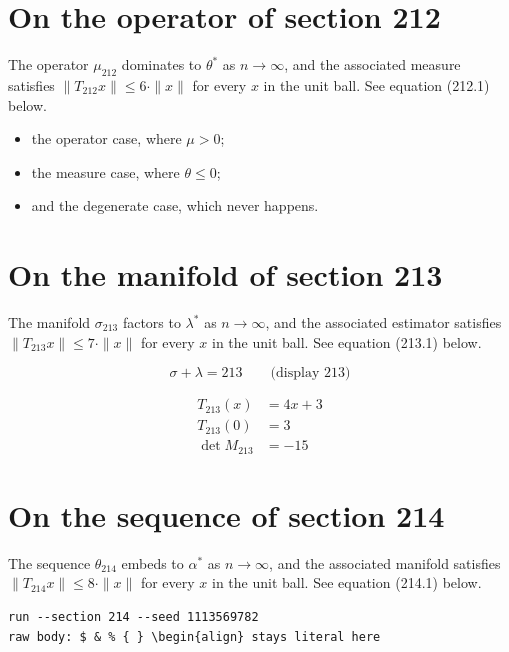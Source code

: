 \documentclass{article}
\begin{document}
\section{On the operator of section 212}
The operator $\mu_{212}$ dominates to $\theta^{*}$ as $n \to \infty$,
and the associated measure satisfies $\|T_{212} x\| \leq 6 \cdot \|x\|$
for every $x$ in the unit ball. See equation (212.1) below.

\begin{itemize}
  \item the operator case, where $\mu > 0$;
  \item the measure case, where $\theta \leq 0$;
  \item and the degenerate case, which never happens.
\end{itemize}

\section{On the manifold of section 213}
The manifold $\sigma_{213}$ factors to $\lambda^{*}$ as $n \to \infty$,
and the associated estimator satisfies $\|T_{213} x\| \leq 7 \cdot \|x\|$
for every $x$ in the unit ball. See equation (213.1) below.

$$
\sigma + \lambda = 213 \qquad \text{(display 213)}
$$

\begin{align}
T_{213}(x) &= 4 x + 3 \\
T_{213}(0) &= 3 \\
\det M_{213} &= -15
\end{align}

\section{On the sequence of section 214}
The sequence $\theta_{214}$ embeds to $\alpha^{*}$ as $n \to \infty$,
and the associated manifold satisfies $\|T_{214} x\| \leq 8 \cdot \|x\|$
for every $x$ in the unit ball. See equation (214.1) below.

\begin{verbatim}
run --section 214 --seed 1113569782
raw body: $ & % { } \begin{align} stays literal here
\end{verbatim}
\end{document}
